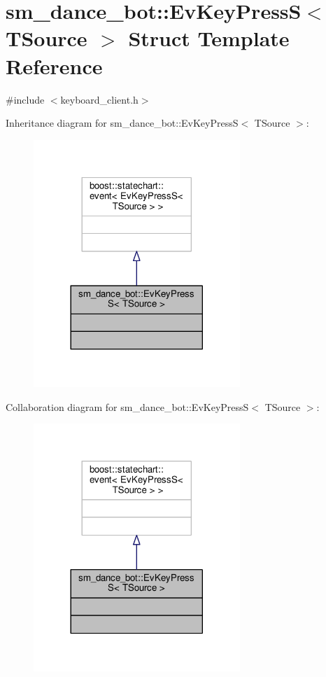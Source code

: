 \hypertarget{structsm__dance__bot_1_1EvKeyPressS}{}\section{sm\+\_\+dance\+\_\+bot\+:\+:Ev\+Key\+PressS$<$ T\+Source $>$ Struct Template Reference}
\label{structsm__dance__bot_1_1EvKeyPressS}


{\ttfamily \#include $<$keyboard\+\_\+client.\+h$>$}



Inheritance diagram for sm\+\_\+dance\+\_\+bot\+:\+:Ev\+Key\+PressS$<$ T\+Source $>$\+:
\nopagebreak
\begin{figure}[H]
\begin{center}
\leavevmode
\includegraphics[width=221pt]{structsm__dance__bot_1_1EvKeyPressS__inherit__graph}
\end{center}
\end{figure}


Collaboration diagram for sm\+\_\+dance\+\_\+bot\+:\+:Ev\+Key\+PressS$<$ T\+Source $>$\+:
\nopagebreak
\begin{figure}[H]
\begin{center}
\leavevmode
\includegraphics[width=221pt]{structsm__dance__bot_1_1EvKeyPressS__coll__graph}
\end{center}
\end{figure}


